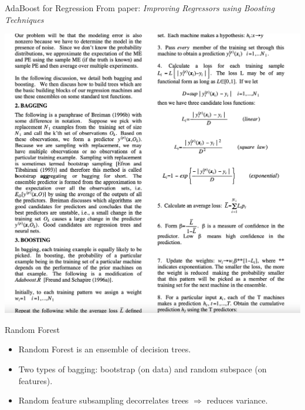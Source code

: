 \documentclass[aspectratio=169,10pt]{beamer}
\newcommand{\fitpic}[1]{\begin{adjustbox}{max width=\linewidth, max totalheight=0.78\textheight}#1\end{adjustbox}}
\begin{document}
\begin{frame}{AdaBoost for Regression}
  From paper: \emph{Improving Regressors using Boosting Techniques}
  \vspace{0.3cm}

  \centering
  \fitpic{\includegraphics[scale=0.1]{../assets/ensemble/diagrams/adaboost-regression.jpg}}
\end{frame}

\begin{frame}{Random Forest}
  \begin{itemize}
    \item Random Forest is an ensemble of decision trees.
    \item Two types of bagging: bootstrap (on data) and random subspace (on features).
    \item Random feature subsampling decorrelates trees $\Rightarrow$ reduces variance.
  \end{itemize}
\end{frame}
\end{document}
